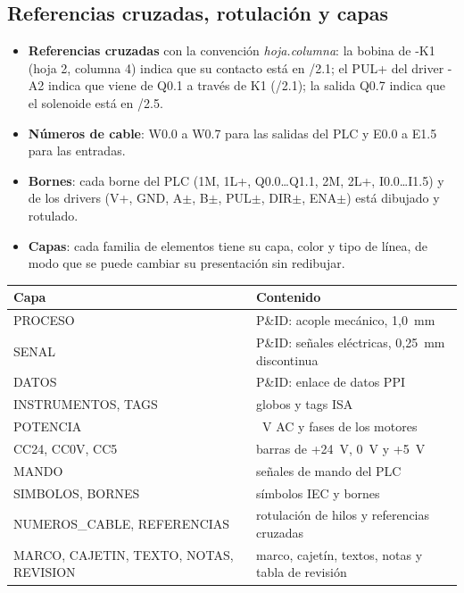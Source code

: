 \documentclass[a4paper,11pt]{article}
\begin{document}
\subsection{Referencias cruzadas, rotulación y capas}
\begin{itemize}
\item \textbf{Referencias cruzadas} con la convención \emph{hoja.columna}: la bobina de -K1 (hoja 2, columna 4) indica que su contacto está en /2.1; el PUL+ del driver -A2 indica que viene de Q0.1 a través de K1 (/2.1); la salida Q0.7 indica que el solenoide está en /2.5.
\item \textbf{Números de cable}: W0.0 a W0.7 para las salidas del PLC y E0.0 a E1.5 para las entradas.
\item \textbf{Bornes}: cada borne del PLC (1M, 1L+, Q0.0\dots Q1.1, 2M, 2L+, I0.0\dots I1.5) y de los drivers (V+, GND, A$\pm$, B$\pm$, PUL$\pm$, DIR$\pm$, ENA$\pm$) está dibujado y rotulado.
\item \textbf{Capas}: cada familia de elementos tiene su capa, color y tipo de línea, de modo que se puede cambiar su presentación sin redibujar.
\end{itemize}
\begin{center}\small
\begin{tabularx}{\linewidth}{>{\ttfamily}l >{\raggedright\arraybackslash}X}
\toprule
\textrm{\textbf{Capa}} & \textbf{Contenido}\\
\midrule
PROCESO & P\&ID: acople mecánico, 1,0~mm\\
SENAL & P\&ID: señales eléctricas, 0,25~mm discontinua\\
DATOS & P\&ID: enlace de datos PPI\\
INSTRUMENTOS, TAGS & globos y tags ISA\\
POTENCIA & 220~V AC y fases de los motores\\
CC24, CC0V, CC5 & barras de +24~V, 0~V y +5~V\\
MANDO & señales de mando del PLC\\
SIMBOLOS, BORNES & símbolos IEC y bornes\\
NUMEROS\_CABLE, REFERENCIAS & rotulación de hilos y referencias cruzadas\\
MARCO, CAJETIN, TEXTO, NOTAS, REVISION & marco, cajetín, textos, notas y tabla de revisión\\
\bottomrule
\end{tabularx}\end{center}
\end{document}
